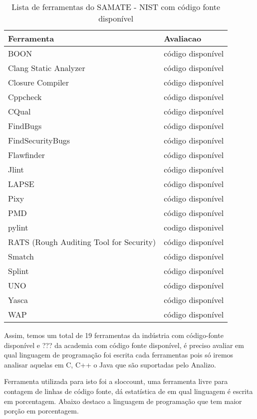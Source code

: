 \documentclass[12pt]{article}
\begin{document}
\begin{table}
\caption{Lista de ferramentas do SAMATE - NIST com código fonte disponível}
\centering
\begin{tabular}{| l | l |}
\hline
Ferramenta & Avaliacao  \\
\hline
BOON                      & código disponível \\
Clang Static Analyzer     & código disponível \\
Closure Compiler          & código disponível \\
Cppcheck                  & código disponível \\
CQual                     & código disponível \\
FindBugs                  & código disponível \\
FindSecurityBugs          & código disponível \\
Flawfinder                & código disponível \\
Jlint                     & código disponível \\
LAPSE                     & código disponível \\
Pixy                      & código disponível \\
PMD                       & código disponível \\
pylint                    & codigo disponivel \\
RATS (Rough Auditing Tool for Security) & código disponível \\
Smatch                    & código disponível \\
Splint                    & código disponível \\
UNO                       & código disponível \\
Yasca                     & código disponível \\
WAP                       & código disponível \\
\hline
\end{tabular}
\label{ferramentas-do-nist-com-codigo}
\end{table}

Assim, temos um total de 19 ferramentas da indústria com código-fonte
disponível e ??? da academia com código fonte disponível, é preciso avaliar em
qual linguagem de programação foi escrita cada ferramentas pois só iremos
analisar aquelas em C, C++ o Java que são suportadas pelo Analizo.

Ferramenta utilizada para isto foi a sloccount, uma ferramenta livre para
contagem de linhas de código fonte, dá estatística de em qual linguagem
é escrita em porcentagem. Abaixo destaco a linguagem de programação que
tem maior porção em porcentagem.
\end{document}

